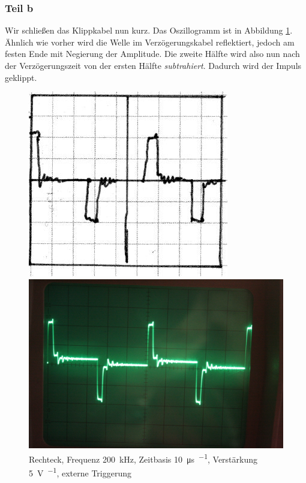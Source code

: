 \FloatBarrier
\subsubsection{Teil b}

Wir schließen das Klippkabel nun kurz. Das Oszillogramm ist in Abbildung
\ref{fig:0774}. Ähnlich wie vorher wird die Welle im Verzögerungskabel
reflektiert, jedoch am festen Ende mit Negierung der Amplitude. Die zweite
Hälfte wird also nun nach der Verzögerungszeit von der ersten Hälfte
\emph{subtrahiert}. Dadurch wird der Impuls geklippt.

\begin{figure}
	\centering
	\begin{minipage}{.45\linewidth}
	\includegraphics[width=\linewidth]{Skizzen/IMG_0774-1500.jpg}
	\end{minipage}
	\hfill
	\begin{minipage}{.45\linewidth}
	\includegraphics[width=\linewidth]{Fotos/IMG_0774-1500.jpg}
	\end{minipage}
	\caption{%
		Rechteck, Frequenz \SI{200}{\kilo\hertz},
		Zeitbasis \SI{10}{\micro\second\per\division},
		Verstärkung \SI{5}{\volt\per\division},
		externe Triggerung
	}
	\label{fig:0774}
\end{figure}

